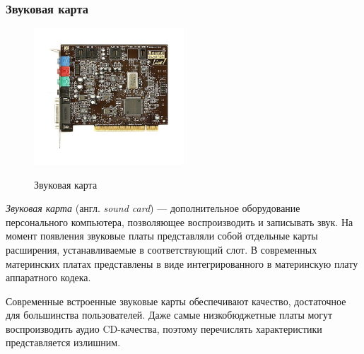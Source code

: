 \subsubsection{Звуковая карта}\label{base:introduction:components:soundcard}
\begin{figure}
 \centering
 \includegraphics[width=0.5\textwidth]{base/Introduction/Soundcard.jpg}
 \label{base:introduction:components:soundcard:soundcardpic}
 \caption{Звуковая карта}
\end{figure}
\emph{Звуковая карта} (англ. \emph{sound card}) --- дополнительное оборудование персонального компьютера, позволяющее воспроизводить и записывать звук.
На момент появления звуковые платы представляли собой отдельные карты расширения, устанавливаемые в соответствующий слот.
В современных материнских платах представлены в виде интегрированного в материнскую плату аппаратного кодека.

Современные встроенные звуковые карты обеспечивают качество, достаточное для большинства пользователей.  Даже самые низкобюджетные платы могут воспроизводить аудио CD-качества, поэтому перечислять характеристики представляется излишним.

